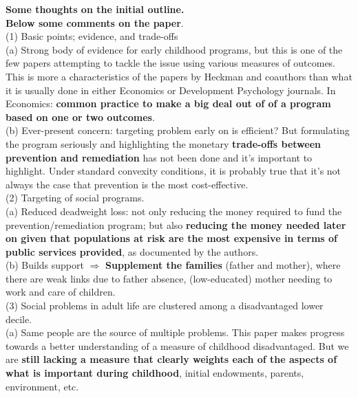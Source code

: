 



\doublespacing

\noindent \textbf{Some thoughts on the initial outline.}\\
\noindent \textbf{Below some comments on the paper}.\\

\noindent (1) Basic points; evidence, and trade-offs \\ 

\noindent (a) Strong body of evidence for early childhood programs, but this is one of the few papers attempting to tackle the issue using various measures of outcomes. This is more a characteristics of the papers by Heckman and coauthors than what it is usually done in either Economics or Development Psychology journals. In Economics: \textbf{common practice to make a big deal out of of a program based on one or two outcomes}.\\

\noindent (b) Ever-present concern: targeting problem early on is efficient? But formulating the program seriously and highlighting the monetary \textbf{trade-offs between prevention and remediation} has not been done and it's important to highlight. Under standard convexity conditions, it is probably true that it's not always the case that prevention is the most cost-effective.\\

\noindent (2) Targeting of social programs.\\ 

\noindent (a) Reduced deadweight loss: not only reducing the money required to fund the prevention/remediation program; but also \textbf{reducing the money needed later on given that populations at risk are the most expensive in terms of public services provided}, as documented by the authors.\\

\noindent (b) Builds support $\Rightarrow$ \textbf{Supplement the families} (father and mother), where there are weak links due to father absence, (low-educated) mother needing to work and care of children.\\ 

\noindent (3) Social problems in adult life are clustered among a disadvantaged lower decile.\\

\noindent (a) Same people are the source of multiple problems. This paper makes progress towards a better understanding of a measure of childhood disadvantaged. But we are \textbf{still lacking a measure that clearly weights each of the aspects of what is important during childhood}, initial endowments, parents, environment, etc.\\

